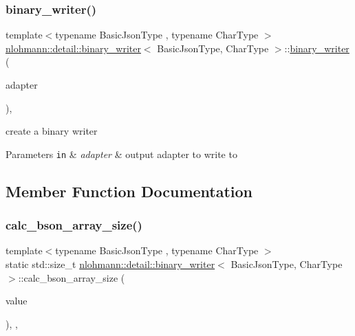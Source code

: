 \subsubsection{\texorpdfstring{binary\+\_\+writer()}{binary\_writer()}}
{\footnotesize\ttfamily template$<$typename Basic\+Json\+Type , typename Char\+Type $>$ \\
\hyperlink{classnlohmann_1_1detail_1_1binary__writer}{nlohmann\+::detail\+::binary\+\_\+writer}$<$ Basic\+Json\+Type, Char\+Type $>$\+::\hyperlink{classnlohmann_1_1detail_1_1binary__writer}{binary\+\_\+writer} (\begin{DoxyParamCaption}\item[{\hyperlink{namespacenlohmann_1_1detail_a9b680ddfb58f27eb53a67229447fc556}{output\+\_\+adapter\+\_\+t}$<$ Char\+Type $>$}]{adapter }\end{DoxyParamCaption})\hspace{0.3cm}{\ttfamily [inline]}, {\ttfamily [explicit]}}



create a binary writer 


\begin{DoxyParams}[1]{Parameters}
\mbox{\tt in}  & {\em adapter} & output adapter to write to \\
\hline
\end{DoxyParams}


\subsection{Member Function Documentation}
\mbox{\label{classnlohmann_1_1detail_1_1binary__writer_af08f9302a02516ff8cf358a99aaa1ddf}} 
\subsubsection{\texorpdfstring{calc\+\_\+bson\+\_\+array\+\_\+size()}{calc\_bson\_array\_size()}}
{\footnotesize\ttfamily template$<$typename Basic\+Json\+Type , typename Char\+Type $>$ \\
static std\+::size\+\_\+t \hyperlink{classnlohmann_1_1detail_1_1binary__writer}{nlohmann\+::detail\+::binary\+\_\+writer}$<$ Basic\+Json\+Type, Char\+Type $>$\+::calc\+\_\+bson\+\_\+array\+\_\+size (\begin{DoxyParamCaption}\item[{const typename Basic\+Json\+Type\+::array\+\_\+t \&}]{value }\end{DoxyParamCaption})\hspace{0.3cm}{\ttfamily [inline]}, {\ttfamily [static]}, {\ttfamily [private]}}

